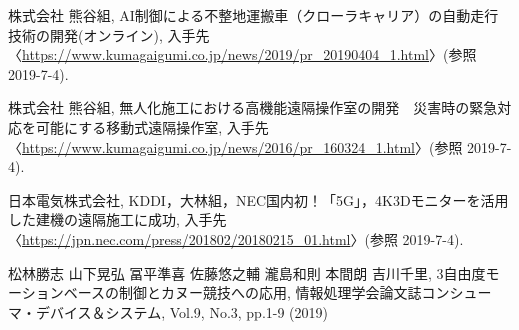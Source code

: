 \documentclass[a4paper,12pt]{jsarticle}
\begin{document}
\begin{flushleft} %
\begin{thebibliography}{9} %

株式会社 熊谷組, AI制御による不整地運搬車（クローラキャリア）の自動走行技術の開発(オンライン), 入手先〈\url{https://www.kumagaigumi.co.jp/news/2019/pr_20190404_1.html}〉(参照 2019-7-4).

株式会社 熊谷組, 無人化施工における高機能遠隔操作室の開発　災害時の緊急対応を可能にする移動式遠隔操作室, 入手先〈\url{https://www.kumagaigumi.co.jp/news/2016/pr_160324_1.html}〉(参照 2019-7-4).

日本電気株式会社, KDDI，大林組，NEC国内初！「5G」，4K3Dモニターを活用した建機の遠隔施工に成功, 入手先〈\url{https://jpn.nec.com/press/201802/20180215_01.html}〉(参照 2019-7-4).

松林勝志 山下晃弘 冨平準喜 佐藤悠之輔 瀧島和則 本間朗 吉川千里, 3自由度モーションベースの制御とカヌー競技への応用, 情報処理学会論文誌コンシューマ・デバイス＆システム, Vol.9, No.3, pp.1-9 (2019)

\end{thebibliography}
\end{flushleft}
\end{document}
